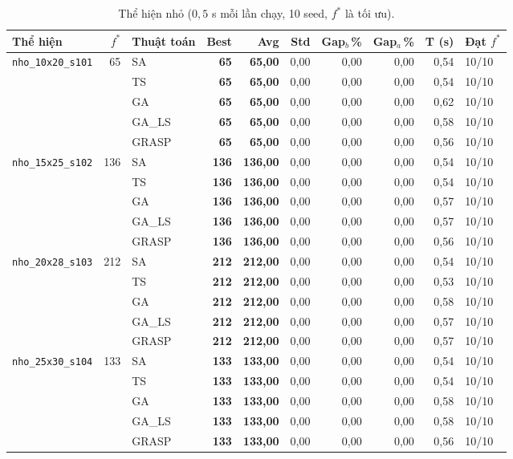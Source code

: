 \documentclass[a4paper,12pt]{article}
\begin{document}
\begin{table}[htbp]
\centering
\caption{Thể hiện nhỏ ($0{,}5$ s mỗi lần chạy, 10 seed, $f^*$ là tối ưu).}
\footnotesize
\setlength{\tabcolsep}{3pt}
\begin{tabularx}{\textwidth}{lrlrrrrrrY}
\toprule
Thể hiện & $f^*$ & Thuật toán & Best & Avg & Std & Gap$_b$\,\% & Gap$_a$\,\% & T (s) & Đạt $f^*$\\
\midrule
\texttt{nho\_10x20\_s101} & 65 & SA & \textbf{65} & \textbf{65{,}00} & 0{,}00 & 0{,}00 & 0{,}00 & 0{,}54 & 10/10\\
 &  & TS & \textbf{65} & \textbf{65{,}00} & 0{,}00 & 0{,}00 & 0{,}00 & 0{,}54 & 10/10\\
 &  & GA & \textbf{65} & \textbf{65{,}00} & 0{,}00 & 0{,}00 & 0{,}00 & 0{,}62 & 10/10\\
 &  & GA\_LS & \textbf{65} & \textbf{65{,}00} & 0{,}00 & 0{,}00 & 0{,}00 & 0{,}58 & 10/10\\
 &  & GRASP & \textbf{65} & \textbf{65{,}00} & 0{,}00 & 0{,}00 & 0{,}00 & 0{,}56 & 10/10\\
\midrule
\texttt{nho\_15x25\_s102} & 136 & SA & \textbf{136} & \textbf{136{,}00} & 0{,}00 & 0{,}00 & 0{,}00 & 0{,}54 & 10/10\\
 &  & TS & \textbf{136} & \textbf{136{,}00} & 0{,}00 & 0{,}00 & 0{,}00 & 0{,}54 & 10/10\\
 &  & GA & \textbf{136} & \textbf{136{,}00} & 0{,}00 & 0{,}00 & 0{,}00 & 0{,}57 & 10/10\\
 &  & GA\_LS & \textbf{136} & \textbf{136{,}00} & 0{,}00 & 0{,}00 & 0{,}00 & 0{,}57 & 10/10\\
 &  & GRASP & \textbf{136} & \textbf{136{,}00} & 0{,}00 & 0{,}00 & 0{,}00 & 0{,}56 & 10/10\\
\midrule
\texttt{nho\_20x28\_s103} & 212 & SA & \textbf{212} & \textbf{212{,}00} & 0{,}00 & 0{,}00 & 0{,}00 & 0{,}54 & 10/10\\
 &  & TS & \textbf{212} & \textbf{212{,}00} & 0{,}00 & 0{,}00 & 0{,}00 & 0{,}53 & 10/10\\
 &  & GA & \textbf{212} & \textbf{212{,}00} & 0{,}00 & 0{,}00 & 0{,}00 & 0{,}58 & 10/10\\
 &  & GA\_LS & \textbf{212} & \textbf{212{,}00} & 0{,}00 & 0{,}00 & 0{,}00 & 0{,}57 & 10/10\\
 &  & GRASP & \textbf{212} & \textbf{212{,}00} & 0{,}00 & 0{,}00 & 0{,}00 & 0{,}57 & 10/10\\
\midrule
\texttt{nho\_25x30\_s104} & 133 & SA & \textbf{133} & \textbf{133{,}00} & 0{,}00 & 0{,}00 & 0{,}00 & 0{,}54 & 10/10\\
 &  & TS & \textbf{133} & \textbf{133{,}00} & 0{,}00 & 0{,}00 & 0{,}00 & 0{,}54 & 10/10\\
 &  & GA & \textbf{133} & \textbf{133{,}00} & 0{,}00 & 0{,}00 & 0{,}00 & 0{,}58 & 10/10\\
 &  & GA\_LS & \textbf{133} & \textbf{133{,}00} & 0{,}00 & 0{,}00 & 0{,}00 & 0{,}58 & 10/10\\
 &  & GRASP & \textbf{133} & \textbf{133{,}00} & 0{,}00 & 0{,}00 & 0{,}00 & 0{,}56 & 10/10\\
\bottomrule
\end{tabularx}
\label{tbl:meta_small}
\end{table}
\end{document}
